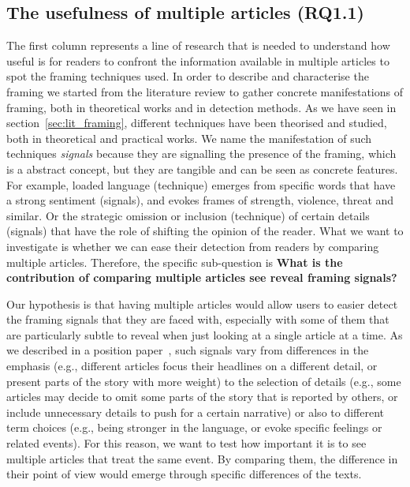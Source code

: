 

\subsection{The usefulness of multiple articles (RQ1.1)}
The first column represents a line of research that is needed to understand how useful is for readers to confront the information available in multiple articles to spot the framing techniques used.
In order to describe and characterise the framing we started from the literature review to gather concrete manifestations of framing, both in theoretical works and in detection methods.
As we have seen in section~\ref{sec:lit_framing}, different techniques have been theorised and studied, both in theoretical and practical works.
We name the manifestation of such techniques \emph{signals} because they are signalling the presence of the framing, which is a abstract concept, but they are tangible and can be seen as concrete features.
For example, loaded language (technique) emerges from specific words that have a strong sentiment (signals), and evokes frames of strength, violence, threat and similar.
Or the strategic omission or inclusion (technique) of certain details (signals) that have the role of shifting the opinion of the reader.
What we want to investigate is whether we can ease their detection from readers by comparing multiple articles. 
Therefore, the specific sub-question is \textbf{What is the contribution of comparing multiple articles see reveal framing signals?}

Our hypothesis is that having multiple articles would allow users to easier detect the framing signals that they are faced with, especially with some of them that are particularly subtle to reveal when just looking at a single article at a time.
As we described in a position paper~\cite{mensio2020towards}, such signals vary from differences in the emphasis (e.g., different articles focus their headlines on a different detail, or present parts of the story with more weight) to the selection of details (e.g., some articles may decide to omit some parts of the story that is reported by others, or include unnecessary details to push for a certain narrative) or also to different term choices (e.g., being stronger in the language, or evoke specific feelings or related events).
For this reason, we want to test how important it is to see multiple articles that treat the same event.
By comparing them, the difference in their point of view would emerge through specific differences of the texts.

